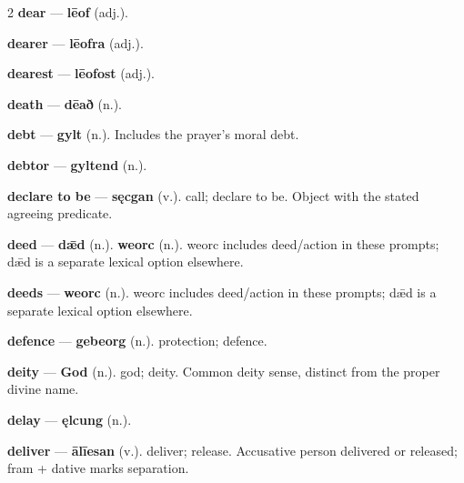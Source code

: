 \begin{multicols}{2}
\textbf{dear} — \textbf{lēof} (adj.).\par
\textbf{dearer} — \textbf{lēofra} (adj.).\par
\textbf{dearest} — \textbf{lēofost} (adj.).\par
\textbf{death} — \textbf{dēað} (n.).\par
\textbf{debt} — \textbf{gylt} (n.). Includes the prayer's moral debt.\par
\textbf{debtor} — \textbf{gyltend} (n.).\par
\textbf{declare to be} — \textbf{sęcgan} (v.). call; declare to be. Object with the stated agreeing predicate.\par
\textbf{deed} — \textbf{dǣd} (n.).  \textbf{weorc} (n.). weorc includes deed/action in these prompts; dǣd is a separate lexical option elsewhere.\par
\textbf{deeds} — \textbf{weorc} (n.). weorc includes deed/action in these prompts; dǣd is a separate lexical option elsewhere.\par
\textbf{defence} — \textbf{gebeorg} (n.). protection; defence.\par
\textbf{deity} — \textbf{God} (n.). god; deity. Common deity sense, distinct from the proper divine name.\par
\textbf{delay} — \textbf{ęlcung} (n.).\par
\textbf{deliver} — \textbf{ālīesan} (v.). deliver; release. Accusative person delivered or released; fram + dative marks separation.\par

\end{multicols}
